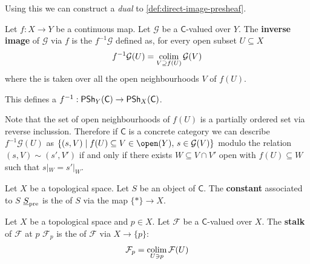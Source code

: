 \documentclass[../main.tex]{subfiles}
\begin{document}
Using this we can construct a \textit{dual}  to \autoref{def:direct-image-presheaf}.
\begin{definition} \label{def:inverse-image-presheaf}
  Let \(f: X \to Y\) be a continuous map.
  Let \(\mathcal{G}\) be a \(\mathsf{C}\)-valued  over \(Y\).
  The \textbf{inverse image } of \(\mathcal{G}\) via \(f\) is the  \(f^{-1}\mathcal{G}\) defined as, for every open subset \(U \subseteq X\)
  \begin{equation*}
    f^{-1}\mathcal{G}(U) = \operatorname*{colim}_{V \supseteq f(U)} \mathcal{G}(V)
  \end{equation*}
  where the  is taken over all the open neighbourhoods \(V\) of \(f(U)\).

  This defines a  \(f^{-1}: \mathsf{PSh}_{Y}(\mathsf{C}) \to \mathsf{PSh}_{X}(\mathsf{C})\).
\end{definition}

\begin{remark}
  Note that the set of open neighbourhoods of \(f(U)\) is a partially ordered set via reverse inclussion.
  Therefore if \(\mathsf{C}\) is a concrete category we can describe \(f^{-1}\mathcal{G}(U)\) as \(\{(s, V) \mid f(U) \subseteq V \in \open(Y),\, s \in \mathcal{G}(V)\}\) modulo the relation \((s, V) \sim (s', V')\) if and only if there exists \(W \subseteq V \cap V'\) open with \(f(U) \subseteq W\) such that \(s|_{W} = s'|_{W}\).
\end{remark}

\begin{example} \label{ex:constant-presheaf}
  Let \(X\) be a topological space.
  Let \(S\) be an object of \(\mathsf{C}\).
  The \textbf{constant } associated to \(S\) \(\underline{S}_{\operatorname*{pre}}\) is the  of \(S\) via the map \(\{\ast\} \to X\).
\end{example}

\begin{definition}[Stalk] \label{def:stalk-presheaf}
  Let \(X\) be a topological space and \(p \in X\).
  Let \(\mathcal{F}\) be a \(\mathsf{C}\)-valued  over \(X\).
  The \textbf{stalk} of \(\mathcal{F}\) at \(p\) \(\mathcal{F}_{p}\) is the  of \(\mathcal{F}\) via \(X \to \{p\}\):
  \begin{equation*}
    \mathcal{F}_{p} = \operatorname*{colim}_{U \ni p} \mathcal{F}(U)
  \end{equation*}
\end{definition}
\end{document}
